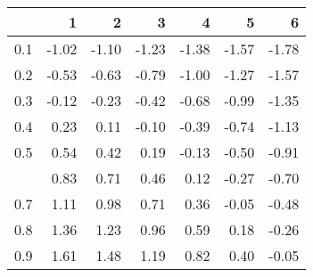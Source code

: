 
\begin{tabular}{lrrrrrr}
\toprule
  & 1 & 2 & 3 & 4 & 5 & 6\\
\midrule
0.1 & -1.02 & -1.10 & -1.23 & -1.38 & -1.57 & -1.78\\
0.2 & -0.53 & -0.63 & -0.79 & -1.00 & -1.27 & -1.57\\
0.3 & -0.12 & -0.23 & -0.42 & -0.68 & -0.99 & -1.35\\
0.4 & 0.23 & 0.11 & -0.10 & -0.39 & -0.74 & -1.13\\
0.5 & 0.54 & 0.42 & 0.19 & -0.13 & -0.50 & -0.91\\
\addlinespace
0.6 & 0.83 & 0.71 & 0.46 & 0.12 & -0.27 & -0.70\\
0.7 & 1.11 & 0.98 & 0.71 & 0.36 & -0.05 & -0.48\\
0.8 & 1.36 & 1.23 & 0.96 & 0.59 & 0.18 & -0.26\\
0.9 & 1.61 & 1.48 & 1.19 & 0.82 & 0.40 & -0.05\\
\bottomrule
\end{tabular}
